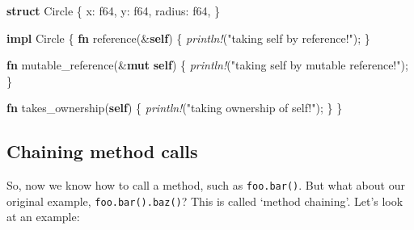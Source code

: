 \documentclass[a4paper,]{book}
\newenvironment{Shaded}{\begin{snugshade}}{\end{snugshade}}
\newcommand{\KeywordTok}[1]{\textcolor[rgb]{0.13,0.29,0.53}{\textbf{{#1}}}}
\newcommand{\DataTypeTok}[1]{\textcolor[rgb]{0.13,0.29,0.53}{{#1}}}
\newcommand{\StringTok}[1]{\textcolor[rgb]{0.31,0.60,0.02}{{#1}}}
\newcommand{\PreprocessorTok}[1]{\textcolor[rgb]{0.56,0.35,0.01}{\textit{{#1}}}}
\newcommand{\NormalTok}[1]{{#1}}
\begin{document}
\begin{Shaded}
\begin{Highlighting}[]
\KeywordTok{struct} \NormalTok{Circle \{}
    \NormalTok{x: }\DataTypeTok{f64}\NormalTok{,}
    \NormalTok{y: }\DataTypeTok{f64}\NormalTok{,}
    \NormalTok{radius: }\DataTypeTok{f64}\NormalTok{,}
\NormalTok{\}}

\KeywordTok{impl} \NormalTok{Circle \{}
    \KeywordTok{fn} \NormalTok{reference(&}\KeywordTok{self}\NormalTok{) \{}
       \PreprocessorTok{println!}\NormalTok{(}\StringTok{"taking self by reference!"}\NormalTok{);}
    \NormalTok{\}}

    \KeywordTok{fn} \NormalTok{mutable_reference(&}\KeywordTok{mut} \KeywordTok{self}\NormalTok{) \{}
       \PreprocessorTok{println!}\NormalTok{(}\StringTok{"taking self by mutable reference!"}\NormalTok{);}
    \NormalTok{\}}

    \KeywordTok{fn} \NormalTok{takes_ownership(}\KeywordTok{self}\NormalTok{) \{}
       \PreprocessorTok{println!}\NormalTok{(}\StringTok{"taking ownership of self!"}\NormalTok{);}
    \NormalTok{\}}
\NormalTok{\}}
\end{Highlighting}
\end{Shaded}

\subsection{Chaining method calls}\label{chaining-method-calls}

So, now we know how to call a method, such as \texttt{foo.bar()}. But
what about our original example, \texttt{foo.bar().baz()}? This is
called `method chaining'. Let's look at an example:
\end{document}
